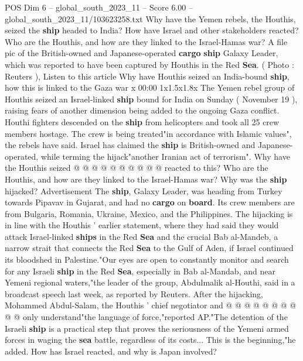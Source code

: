 \begin{textsample}{POS Dim 6 – global\_south\_2023\_11 – Score 6.00 – global\_south\_2023\_11/103623258.txt}  \label{ex:f6_pos_254}
Why have the Yemen rebels, the Houthis, seized the \textbf{ship} headed to India?
How have Israel and other stakeholders reacted?
Who are the Houthis, and how are they linked to the Israel-Hamas war?
A file pic of the British-owned and Japanese-operated \textbf{cargo} \textbf{ship} Galaxy Leader, which was reported to have been captured by Houthis in the Red \textbf{Sea}. ( Photo : Reuters ), Listen to this article Why have Houthis seized an India-bound \textbf{ship}, how this is linked to the Gaza war x 00:00 1x1.5x1.8x The Yemen rebel group of Houthis seized an Israel-linked \textbf{ship} bound for India on Sunday ( November 19 ), raising fears of another dimension being added to the ongoing Gaza conflict.
Houthi fighters descended on the \textbf{ship} from helicopters and took all 25 crew members hostage.
The crew is being treated"in accordance with Islamic values", the rebels have said.
Israel has claimed the \textbf{ship} is British-owned and Japanese-operated, while terming the hijack"another Iranian act of terrorism".
Why have the Houthis seized @ @ @ @ @ @ @ @ @ @ reacted to this?
Who are the Houthis, and how are they linked to the Israel-Hamas war?
Why was the \textbf{ship} hijacked?
Advertisement The \textbf{ship}, Galaxy Leader, was heading from Turkey towards Pipavav in Gujarat, and had no \textbf{cargo} on \textbf{board}.
Its crew members are from Bulgaria, Romania, Ukraine, Mexico, and the Philippines.
The hijacking is in line with the Houthis ' earlier statement, where they had said they would attack Israel-linked \textbf{ships} in the Red \textbf{Sea} and the crucial Bab al-Mandeb, a narrow strait that connects the Red \textbf{Sea} to the Gulf of Aden, if Israel continued its bloodshed in Palestine."Our eyes are open to constantly monitor and search for any Israeli \textbf{ship} in the Red \textbf{Sea}, especially in Bab al-Mandab, and near Yemeni regional waters,"the leader of the group, Abdulmalik al-Houthi, said in a broadcast speech last week, as reported by Reuters.
After the hijacking, Mohammed Abdul-Salam, the Houthis ' chief negotiator and @ @ @ @ @ @ @ @ @ @ only understand"the language of force,"reported AP."The detention of the Israeli \textbf{ship} is a practical step that proves the seriousness of the Yemeni armed forces in waging the \textbf{sea} battle, regardless of its costs...
This is the beginning,"he added.
How has Israel reacted, and why is Japan involved?

\end{textsample}
